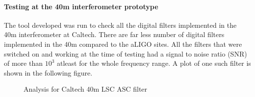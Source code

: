 \documentclass[colorlinks=true,pdfstartview=FitV,linkcolor=blue,
            citecolor=red,urlcolor=magenta]{ligodoc}
\begin{document}
		\paragraph{Testing at the 40m interferometer prototype}
	The tool developed was run to check all the digital filters implemented in the 40m interferometer at Caltech. There are far less number of digital filters implemented in the 40m compared to the aLIGO sites. All the filters that were switched on and working at the time of testing had a signal to noise ratio (SNR) of more than $10^{3}$ atleast for the whole frequency range. A plot of one such filter is shown in the following figure.
		\begin{figure}[H]
 
			  \centering
			  
%			  
			  \def\svgscale{0.35}
			  \tiny{
			  
			  }
			
		\end{figure}
		\begin{figure}[H]
 
			  \centering
			   \label{40mfilt}
%			  
			  \def\svgscale{0.7}
			  \tiny{
			  
			  }
			  \caption{Analysis for Caltech 40m LSC ASC filter}
		\end{figure}
\end{document}
